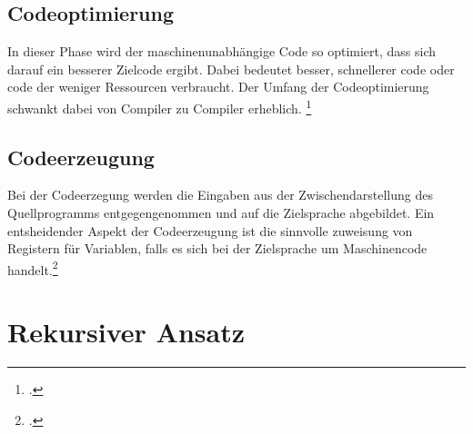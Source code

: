 \subsection{Codeoptimierung}
In dieser Phase wird der maschinenunabhängige Code so optimiert, dass sich darauf ein besserer Zielcode ergibt. Dabei bedeutet besser, schnellerer code oder code der weniger Ressourcen verbraucht. Der Umfang der Codeoptimierung schwankt dabei von Compiler zu Compiler erheblich.  \footcite[Vgl.][S. 11f]{Ullmann2008}
\subsection{Codeerzeugung}
Bei der Codeerzegung werden die Eingaben aus der Zwischendarstellung des Quellprogramms entgegengenommen und auf die Zielsprache abgebildet. Ein entsheidender Aspekt der Codeerzeugung ist die sinnvolle zuweisung von Registern für Variablen, falls es sich bei der Zielsprache um Maschinencode handelt.\footcite[Vgl.][S. 13]{Ullmann2008}

\section{Rekursiver Ansatz}